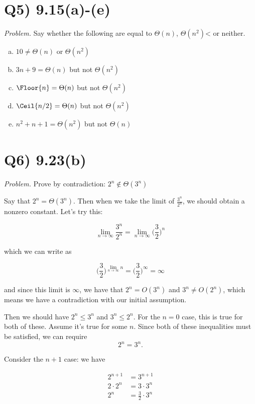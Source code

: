 \documentclass{article}
\DeclarePairedDelimiter\Floor\lfloor\rfloor
\DeclarePairedDelimiter\Ceil\lceil\rceil
\begin{document}
\section*{Q5) 9.15(a)-(e)}

\textit{Problem.} Say whether the following are equal to $\Theta(n)$, $\Theta(n^2)$< or neither.

\begin{enumerate}[(a)]
  \item $10 \neq \Theta(n)$ or $\Theta(n^2)$
  \item $3n+9 = \Theta(n)$ but not $\Theta(n^2)$
  \item $\Floor{n} = \Theta(n)$ but not $\Theta(n^2)$
  \item $\Ceil{n/2} = \Theta(n)$ but not $\Theta(n^2)$
  \item $n^2 + n + 1 = \Theta(n^2)$ but not $\Theta(n)$
\end{enumerate}


\section*{Q6) 9.23(b)}

\textit{Problem.} Prove by contradiction: $2^n \not\in \Theta(3^n)$

Say that $2^n = \Theta(3^n)$. Then when we take the limit of $\frac{3^n}{2^n}$, we should obtain a nonzero constant. Let's try this:

$$\lim_{n\rightarrow\infty} \frac{3^n}{2^n} = \lim_{n\rightarrow\infty} \Big(\frac{3}{2}\Big)^n$$

which we can write as

$$\Big(\frac{3}{2}\Big)^{\lim_{n\rightarrow\infty} n} = \Big(\frac{3}{2}\Big)^{\infty} = \infty$$

and since this limit is $\infty$, we have that $2^n = O(3^n)$ and $3^n \neq O(2^n)$, which means we have a contradiction with our initial assumption.


Then we should have $2^n \leq 3^n$ and $3^n \leq 2^n$. For the $n=0$ case, this is true for both of these. Assume it's true for some $n$. Since both of these inequalities must be satisfied, we can require $$2^n = 3^n.$$ 

Consider the $n+1$ case: we have

\begin{align*}
  2^{n+1} &= 3^{n+1} \\
  2\cdot2^n &= 3\cdot3^n \\
  2^n &= \frac{3}{2}\cdot 3^n
\end{align*}
\end{document}

